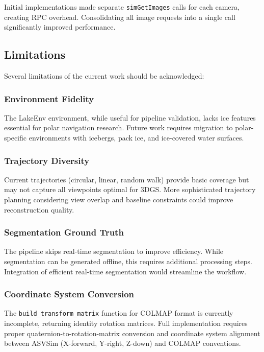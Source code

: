 Initial implementations made separate \texttt{simGetImages} calls for each camera, creating RPC overhead. Consolidating all image requests into a single call significantly improved performance.

\subsection{Limitations}

Several limitations of the current work should be acknowledged:

\subsubsection{Environment Fidelity}

The LakeEnv environment, while useful for pipeline validation, lacks ice features essential for polar navigation research. Future work requires migration to polar-specific environments with icebergs, pack ice, and ice-covered water surfaces.

\subsubsection{Trajectory Diversity}

Current trajectories (circular, linear, random walk) provide basic coverage but may not capture all viewpoints optimal for 3DGS. More sophisticated trajectory planning considering view overlap and baseline constraints could improve reconstruction quality.

\subsubsection{Segmentation Ground Truth}

The pipeline skips real-time segmentation to improve efficiency. While segmentation can be generated offline, this requires additional processing steps. Integration of efficient real-time segmentation would streamline the workflow.

\subsubsection{Coordinate System Conversion}

The \texttt{build\_transform\_matrix} function for COLMAP format is currently incomplete, returning identity rotation matrices. Full implementation requires proper quaternion-to-rotation-matrix conversion and coordinate system alignment between ASVSim (X-forward, Y-right, Z-down) and COLMAP conventions.

